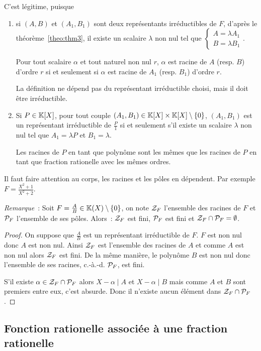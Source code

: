 C'est légitime, puisque
\begin{enumerate}
\item si $(A,B)$ et $(A_1,B_1)$ sont deux représentants irréductibles de $F$, d'après le théorème~\ref{theo:thm3}, il existe un scalaire $\lambda$ non nul tel que $\begin{cases} A=\lambda A_1 \\ B = \lambda B_1 \end{cases}$.

  Pour tout scalaire $\alpha$ et tout naturel non nul $r$, $\alpha$ est racine de $A$ (resp. $B$) d'ordre $r$ si et seulement si $\alpha$ est racine de $A_1$ (resp. $B_1$) d'ordre $r$.

  La définition ne dépend pas du représentant irréductible choisi, mais il doit être irréductible.
\item Si $P \in \K[X]$, pour tout couple $(A_1,B_1) \in \K[X] \times \K[X]\setminus\{0\}$, $(A_1,B_1)$ est un représentant irréductible de $\frac{P}{1}$ si et seulement s'il existe un scalaire $\lambda$ non nul tel que $A_1=\lambda P$ et $B_1=\lambda$.

  Les racines de $P$ en tant que polynôme sont les mêmes que les racines de $P$ en tant que fraction rationelle avec les mêmes ordres.
\end{enumerate}

Il faut faire attention au corps, les racines et les pôles en dépendent. Par exemple $F=\frac{X^2+1}{X^2+2}$.

\emph{Remarque}~: Soit $F=\frac{A}{B} \in \K(X)\setminus\{0\}$, on note $\ZZ_F$ l'ensemble des racines de $F$ et $\P_F$ l'ensemble de ses pôles. Alors~: $\ZZ_F$ est fini, $\P_F$ est fini et $\ZZ_F \cap \P_F =\emptyset$.

\begin{proof}
  On suppose que $\frac{A}{B}$ est un représentant irréductible de $F$. $F$ est non nul donc $A$ est non nul. Ainsi $\ZZ_F$ est l'ensemble des racines de $A$ et comme $A$ est non nul alors $\ZZ_F$ est fini. De la même manière, le polynôme $B$ est non nul donc l'ensemble de ses racines, c.-à.-d. $\P_F$, est fini.
  
  S'il existe $\alpha \in \ZZ_F \cap \P_F$ alors $X-\alpha\mid{}A$ et $X-\alpha\mid{}B$ mais comme $A$ et $B$ sont premiers entre eux, c'est absurde. Donc il n'existe aucun élément dans $\ZZ_F \cap \P_F$.
\end{proof}

\subsection{Fonction rationelle associée à une fraction rationelle}

